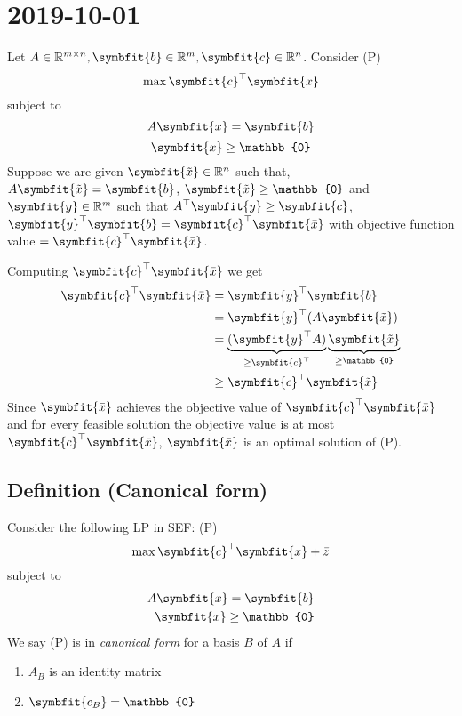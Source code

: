 \section{2019-10-01}
Let $A\in \mathbb{R}^{m\times n}, \symbfit{b}\in\mathbb{R}^m, \symbfit{c}\in\mathbb{R}^n$.
Consider (P)
\[\max \symbfit{c}^\top \symbfit{x}\]
subject to
\[ A\symbfit{x}=\symbfit{b} \]
\[ \symbfit{x}\ge\mathbb{0} \]
Suppose we are given
$\symbfit{\tilde{x}}\in\mathbb{R}^n$ such that, $A\symbfit{\tilde{x}}=\symbfit{b}$,
$\symbfit{\tilde{x}}\ge\mathbb{0}$
and
$\symbfit{y}\in\mathbb{R}^m$ such that $A^\top \symbfit{y}\ge\symbfit{c}$,
$\symbfit{y}^\top \symbfit{b}=\symbfit{c}^\top \symbfit{\bar{x}}$ with objective function
value $=\symbfit{c}^\top \symbfit{\bar{x}}$.


Computing $\symbfit{c}^\top \symbfit{\bar{x}}$ we get
\begin{align*}
    \symbfit{c}^\top \symbfit{\bar{x}}&=\symbfit{y}^\top \symbfit{b}\\
    &=\symbfit{y}^\top (A\symbfit{\tilde{x}})\\
    &=
    \underbrace{(\symbfit{y}^\top A)}_{\ge \symbfit{c}^\top }
    \underbrace{\symbfit{\tilde{x}}}_{\ge \mathbb{0}}\\
    &\ge \symbfit{c}^\top \symbfit{\tilde{x}}
\end{align*}
Since $\symbfit{\bar{x}}$ achieves the objective value of 
$\symbfit{c}^\top \symbfit{\bar{x}}$ and for every feasible solution the objective
value is at most $\symbfit{c}^\top \symbfit{\bar{x}}$, $\symbfit{\bar{x}}$ is an
optimal solution of (P).


\begin{defbox}
    \subsection{Definition (Canonical form)}
    Consider the following LP in SEF: (P)
    \[\max \symbfit{c}^\top  \symbfit{x}+\bar{z}\]
    subject to
    \begin{align*}
        A\symbfit{x}=\symbfit{b}\\
        \symbfit{x}\ge \mathbb{0}
    \end{align*}
    We say (P) is in \emph{canonical form} for a basis $B$ of $A$ if
    \begin{enumerate}[(C1)]
        \item $A_B$ is an identity matrix
        \item $\symbfit{c_B}=\mathbb{0}$
    \end{enumerate}
\end{defbox}


